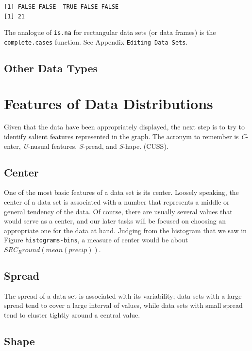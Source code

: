 \documentclass[10pt,english]{scrbook}
\begin{document}
\begin{verbatim}
[1] FALSE FALSE  TRUE FALSE FALSE
[1] 21
\end{verbatim}

The analogue of \texttt{is.na} for rectangular data sets (or data frames) is the \texttt{complete.cases} function. See Appendix \texttt{Editing Data Sets}.
\subsection[Other Data Types]{Other Data Types}
\label{sec-1-1-7}
\section[Features of Data Distributions]{Features of Data Distributions}
\label{sec-1-2}

Given that the data have been appropriately displayed, the next step is to try to identify salient features represented in the graph. The acronym to remember is \emph{C}-enter, \emph{U}-nusual features, \emph{S}-pread, and \emph{S}-hape. (CUSS).

\subsection[Center]{Center}
\label{sec-1-2-1}

One of the most basic features of a data set is its center. Loosely speaking, the center of a data set is associated with a number that represents a middle or general tendency of the data. Of course, there are usually several values that would serve as a center, and our later tasks will be focused on choosing an appropriate one for the data at hand. Judging from the histogram that we saw in Figure \texttt{histograms-bins}, a measure of center would be about \( SRC_R{round(mean(precip))} \). 
\subsection[Spread]{Spread}
\label{sec-1-2-2}

The spread of a data set is associated with its variability; data sets with a large spread tend to cover a large interval of values, while data sets with small spread tend to cluster tightly around a central value. 
\subsection[Shape]{Shape}
\label{sec-1-2-3}
\end{document}
